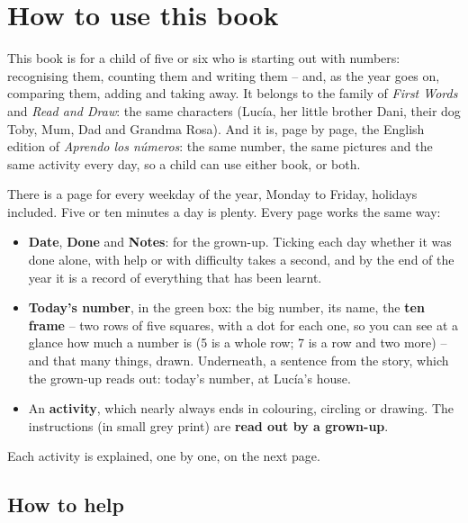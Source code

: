 \section*{How to use this book}

This book is for a child of five or six who is starting out with
numbers: recognising them, counting them and writing them -- and, as the
year goes on, comparing them, adding and taking away. It belongs to the
family of \emph{First Words} and \emph{Read and Draw}: the same
characters (Lucía, her little brother Dani, their dog Toby, Mum, Dad and
Grandma Rosa). And it is, page by page, the English edition of
\emph{Aprendo los números}: the same number, the same pictures and the
same activity every day, so a child can use either book, or both.

There is a page for every weekday of the year, Monday to Friday,
holidays included. Five or ten minutes a day is plenty. Every page works
the same way:

\begin{itemize}[leftmargin=6mm]
\item \textbf{Date}, \textbf{Done} and \textbf{Notes}: for the grown-up.
  Ticking each day whether it was done alone, with help or with
  difficulty takes a second, and by the end of the year it is a record
  of everything that has been learnt.
\item \textbf{Today's number}, in the green box: the big number, its
  name, the \textbf{ten frame} -- two rows of five squares, with a dot
  for each one, so you can see at a glance how much a number is (5 is a
  whole row; 7 is a row and two more) -- and that many things, drawn.
  Underneath, a sentence from the story, which the grown-up reads out:
  today's number, at Lucía's house.
\item An \textbf{activity}, which nearly always ends in colouring,
  circling or drawing. The instructions (in small grey print) are
  \textbf{read out by a grown-up}.
\end{itemize}

Each activity is explained, one by one, on the next page.

\subsection*{How to help}

